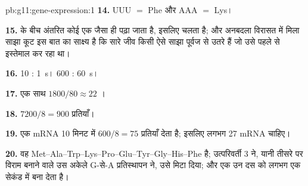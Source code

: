 \begin{solution}{pb:g11:gene-expression:1}
\textbf{14.} UUU $=$ Phe और AAA $=$ Lys।

\textbf{15.}  के बीच अंतरित कोई  एक जैसा ही पढ़ा जाता है, इसलिए
 चलता है; और अनबदला विरासत में मिला साझा कूट इस बात का साक्ष्य है
कि सारे जीव किसी ऐसे साझा पूर्वज से उतरे हैं जो उसे पहले से इस्तेमाल कर
रहा था।

\textbf{16.} 10 : \qty{1}{s}। 600 : \qty{60}{s}।

\textbf{17.} एक साथ $1800/80 \approx 22$ ।

\textbf{18.} $7200/8 = 900$ प्रतियाँ।

\textbf{19.} एक mRNA 10 मिनट में $600/8 = 75$ प्रतियाँ देता है; इसलिए
लगभग 27 mRNA चाहिए।

\textbf{20.} वह 
Met--Ala--Trp--Lys--Pro--Glu--Tyr--Gly--His--Phe है; उत्परिवर्ती 3 ने,
यानी तीसरे  पर विराम बनाने वाले उस अकेले G-से-A प्रतिस्थापन ने, उसे
मिटा दिया; और एक  उन दस  को लगभग एक सेकंड में बना देता
है।
\end{solution}
